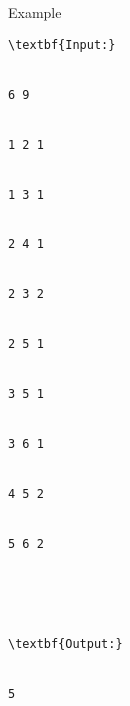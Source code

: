 Example
\begin{verbatim}
\textbf{Input:}


6 9


1 2 1


1 3 1


2 4 1


2 3 2


2 5 1


3 5 1


3 6 1


4 5 2


5 6 2





\textbf{Output:}


5


\end{verbatim}